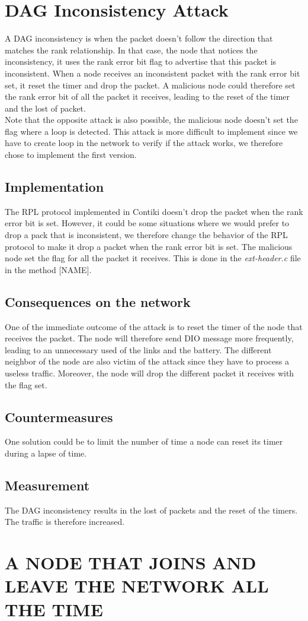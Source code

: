 \documentclass{report}
\begin{document}
\section{DAG Inconsistency Attack}
A DAG inconsistency is when the packet doesn't follow the direction that matches the rank relationship. In that case, the node that notices the inconsistency, it uses the rank error bit flag to advertise that this packet is inconsistent. When a node receives an inconsistent packet with the rank error bit set, it reset the timer and drop the packet. A malicious node could therefore set the rank error bit of all the packet it receives, leading to the reset of the timer and the lost of packet.\\

Note that the opposite attack is also possible, the malicious node doesn't set the flag where a loop is detected. This attack is more difficult to implement since we have to create loop in the network to verify if the attack works, we therefore chose to implement the first version.

\subsection*{Implementation}
The RPL protocol implemented in Contiki doesn't drop the packet when the rank error bit is set. However, it could be some situations where we would prefer to drop a pack that is inconsistent, we therefore change the behavior of the RPL protocol to make it drop a packet when the rank error bit is set. The malicious node set the flag for all the packet it receives. This is done in the \textit{ext-header.c} file in the method [NAME].

\subsection*{Consequences on the network}
One of the immediate outcome of the attack is to reset the timer of the node that receives the packet. The node will therefore send DIO message more frequently, leading to an unnecessary used of the links and the battery. The different neighbor of the node are also victim of the attack since they have to process a useless traffic. Moreover, the node will drop the different packet it receives with the flag set.

\subsection*{Countermeasures}

One solution could be to limit the number of time a node can reset its timer during a lapse of time. 
\subsection*{Measurement}
The DAG inconsistency results in the lost of packets and the reset of the timers. The traffic is therefore increased.

\section{A NODE THAT JOINS AND LEAVE THE NETWORK ALL THE TIME}
\end{document}
